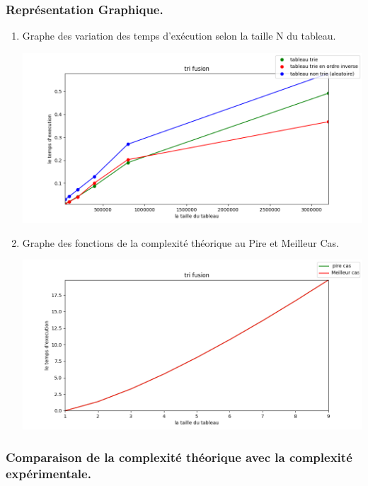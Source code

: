 \documentclass[12pt]{article}
\begin{document}
\subsubsection{Représentation Graphique.}
\begin{enumerate}
	\item Graphe des variation des temps d'exécution selon la taille N du tableau.
	
	\includegraphics[width=1\textwidth]{graph/tri_fusion.png}
	
	
	\item Graphe des fonctions de la complexité théorique au Pire et Meilleur Cas.

	\includegraphics[width=1\textwidth]{graph/tri_fusion_teorique.png}	
	
\end{enumerate}

\subsubsection{Comparaison de la complexité théorique avec la complexité expérimentale.}





\newpage
\end{document}
